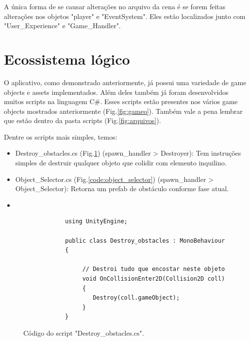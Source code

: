     A única forma de se causar alterações no arquivo da cena é se forem feitas alterações nos objetos "player" e "EventSystem".
    Eles estão localizados junto com "User\_Experience" e "Game\_Handler".




    \section{Ecossistema lógico}

    O aplicativo, como demonstrado anteriormente, já possui uma variedade de game objects e assets implementados.
    Além deles também já foram desenvolvidos muitos scripts na linguagem C\#.
    Esses scripts estão presentes nos vários game objects mostrados anteriormente (Fig.\ref{fig:gameo}). 
    Também vale a pena lembrar que estão dentro da pasta scripts (Fig.\ref{fig:arquivos}).

    Dentre os scripts mais simples, temos:

    \begin{itemize}

        \item Destroy\_obstacles.cs (Fig.\ref{code:destruction_code}) (spawn\_handler > Destroyer): Tem instruções simples de destruir qualquer objeto que colidir com elemento inquilino.

        \item Object\_Selector.cs (Fig.\ref{code:object_selector}) (spawn\_handler > Object\_Selector): Retorna um prefab de obstáculo conforme fase atual.

        \item 

    \end{itemize}


    \begin{figure}[ht!]
        \centering
        \begin{lstlisting}
            using UnityEngine;

            public class Destroy_obstacles : MonoBehaviour
            {
                
                 // Destroi tudo que encostar neste objeto
                 void OnCollisionEnter2D(Collision2D coll) 
                 {
                    Destroy(coll.gameObject);
                 }
            }
        \end{lstlisting}
        \caption{Código do script "Destroy\_obstacles.cs".}
        \label{code:destruction_code}

    \end{figure}



